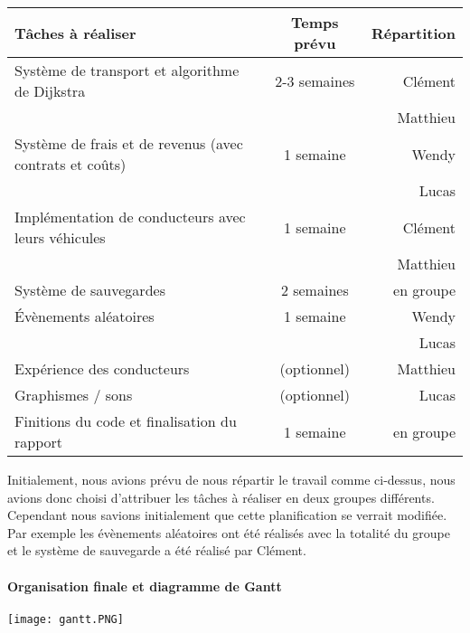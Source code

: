 \documentclass[a4paper, 12pt]{article}
\begin{document}
    
     \begin{tabular}{|l|c|r|}
         \hline
        Tâches à réaliser & Temps prévu & Répartition \\
        \hline
        Système de transport et algorithme de Dijkstra & 2-3 semaines & Clément\\
        && Matthieu\\
        \hline
         Système de frais et de revenus (avec contrats et coûts)  & 1 semaine & Wendy \\
         && Lucas\\
        \hline
         Implémentation de conducteurs avec leurs véhicules  & 1 semaine & Clément\\
         && Matthieu \\
         \hline
         Système de sauvegardes & 2 semaines & en groupe \\
          \hline
         Évènements aléatoires & 1 semaine & Wendy \\ 
         && Lucas \\
          \hline
          Expérience des conducteurs & (optionnel) & Matthieu\\
          \hline
         
        Graphismes / sons & (optionnel) & Lucas \\
        \hline
         Finitions du code et finalisation du rapport  & 1 semaine & en groupe \\
         \hline
        \end{tabular}\newline\newline
        Initialement, nous avions prévu de nous répartir le travail comme ci-dessus, nous avions donc choisi d’attribuer les tâches à réaliser en deux groupes différents. Cependant nous savions initialement que cette planification se verrait modifiée. Par exemple les évènements aléatoires ont été réalisés avec la totalité du groupe et le système de sauvegarde a été réalisé par Clément.
        
        \newpage
        \paragraph{Organisation finale et diagramme de Gantt\newline\newline}
        
        \texttt{[image: gantt.PNG]}
    
\end{document}
